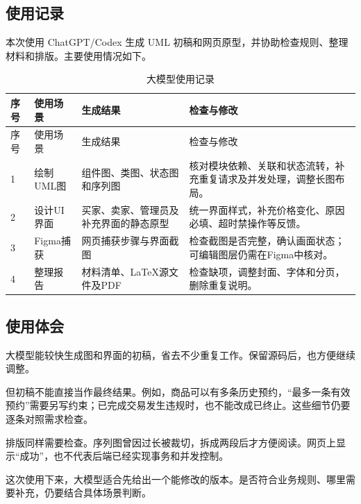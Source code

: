 \documentclass[UTF8,zihao=-4,a4paper,fontset=none]{ctexart}
\renewcommand{\arraystretch}{1.25}
\begin{document}
\subsection{使用记录}
本次使用 ChatGPT/Codex 生成 UML 初稿和网页原型，并协助检查规则、整理材料和排版。主要使用情况如下。

\begingroup
\fontsize{9.5}{13}\selectfont
\renewcommand{\arraystretch}{1.15}
\begin{longtable}{@{}p{8mm}p{29mm}p{43mm}p{65mm}@{}}
\caption{大模型使用记录}\\
\toprule 序号 & 使用场景 & 生成结果 & 检查与修改\\\midrule\endfirsthead
\toprule 序号 & 使用场景 & 生成结果 & 检查与修改\\\midrule\endhead
1 & 绘制UML图 & 组件图、类图、状态图和序列图 & 核对模块依赖、关联和状态流转，补充重复请求及并发处理，调整长图布局。\\
2 & 设计UI界面 & 买家、卖家、管理员及补充界面的静态原型 & 统一界面样式，补充价格变化、原因必填、超时禁操作等反馈。\\
3 & Figma捕获 & 网页捕获步骤与界面截图 & 检查截图是否完整，确认画面状态；可编辑图层仍需在Figma中核对。\\
4 & 整理报告 & 材料清单、LaTeX源文件及PDF & 检查缺项，调整封面、字体和分页，删除重复说明。\\\bottomrule
\end{longtable}
\endgroup

\subsection{使用体会}
大模型能较快生成图和界面的初稿，省去不少重复工作。保留源码后，也方便继续调整。

但初稿不能直接当作最终结果。例如，商品可以有多条历史预约，“最多一条有效预约”需要另写约束；已完成交易发生违规时，也不能改成已终止。这些细节仍要逐条对照需求检查。

排版同样需要检查。序列图曾因过长被裁切，拆成两段后才方便阅读。网页上显示“成功”，也不代表后端已经实现事务和并发控制。

这次使用下来，大模型适合先给出一个能修改的版本。是否符合业务规则、哪里需要补充，仍要结合具体场景判断。
\end{document}
